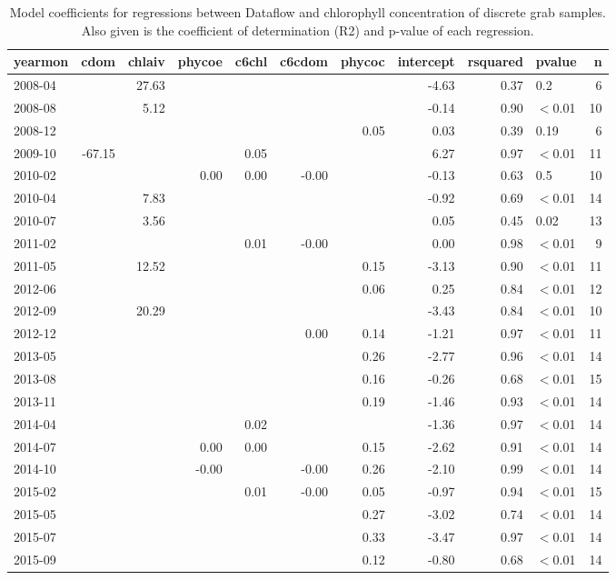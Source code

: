 \begin{table}[ht]
\centering
\caption{Model coefficients for regressions between Dataflow and chlorophyll concentration of discrete grab samples. Also given is the coefficient of determination (R2) and p-value of each regression.} 
\begin{tabular}{lrrrrrrrrlr}
  \hline
yearmon & cdom & chlaiv & phycoe & c6chl & c6cdom & phycoc & intercept & rsquared & pvalue & n \\ 
  \hline
2008-04 &  & 27.63 &  &  &  &  & -4.63 & 0.37 & 0.2 &   6 \\ 
  2008-08 &  & 5.12 &  &  &  &  & -0.14 & 0.90 & $<$0.01 &  10 \\ 
  2008-12 &  &  &  &  &  & 0.05 & 0.03 & 0.39 & 0.19 &   6 \\ 
  2009-10 & -67.15 &  &  & 0.05 &  &  & 6.27 & 0.97 & $<$0.01 &  11 \\ 
  2010-02 &  &  & 0.00 & 0.00 & -0.00 &  & -0.13 & 0.63 & 0.5 &  10 \\ 
  2010-04 &  & 7.83 &  &  &  &  & -0.92 & 0.69 & $<$0.01 &  14 \\ 
  2010-07 &  & 3.56 &  &  &  &  & 0.05 & 0.45 & 0.02 &  13 \\ 
  2011-02 &  &  &  & 0.01 & -0.00 &  & 0.00 & 0.98 & $<$0.01 &   9 \\ 
  2011-05 &  & 12.52 &  &  &  & 0.15 & -3.13 & 0.90 & $<$0.01 &  11 \\ 
  2012-06 &  &  &  &  &  & 0.06 & 0.25 & 0.84 & $<$0.01 &  12 \\ 
  2012-09 &  & 20.29 &  &  &  &  & -3.43 & 0.84 & $<$0.01 &  10 \\ 
  2012-12 &  &  &  &  & 0.00 & 0.14 & -1.21 & 0.97 & $<$0.01 &  11 \\ 
  2013-05 &  &  &  &  &  & 0.26 & -2.77 & 0.96 & $<$0.01 &  14 \\ 
  2013-08 &  &  &  &  &  & 0.16 & -0.26 & 0.68 & $<$0.01 &  15 \\ 
  2013-11 &  &  &  &  &  & 0.19 & -1.46 & 0.93 & $<$0.01 &  14 \\ 
  2014-04 &  &  &  & 0.02 &  &  & -1.36 & 0.97 & $<$0.01 &  14 \\ 
  2014-07 &  &  & 0.00 & 0.00 &  & 0.15 & -2.62 & 0.91 & $<$0.01 &  14 \\ 
  2014-10 &  &  & -0.00 &  & -0.00 & 0.26 & -2.10 & 0.99 & $<$0.01 &  14 \\ 
  2015-02 &  &  &  & 0.01 & -0.00 & 0.05 & -0.97 & 0.94 & $<$0.01 &  15 \\ 
  2015-05 &  &  &  &  &  & 0.27 & -3.02 & 0.74 & $<$0.01 &  14 \\ 
  2015-07 &  &  &  &  &  & 0.33 & -3.47 & 0.97 & $<$0.01 &  14 \\ 
  2015-09 &  &  &  &  &  & 0.12 & -0.80 & 0.68 & $<$0.01 &  14 \\ 
   \hline
\end{tabular}
\end{table}
